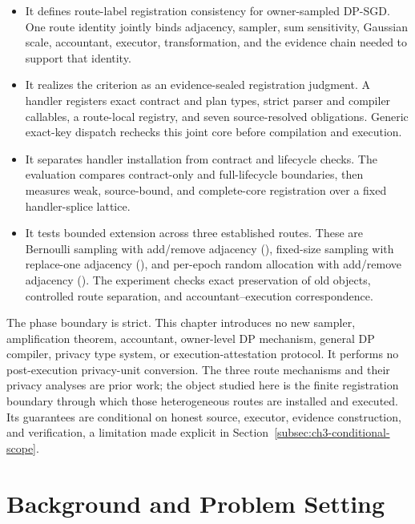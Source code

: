 \begin{itemize}
    \item It defines route-label registration consistency for owner-sampled
    DP-SGD.  One route identity jointly binds adjacency, sampler, sum sensitivity,
    Gaussian scale, accountant, executor, transformation, and the evidence chain
    needed to support that identity.

    \item It realizes the criterion as an evidence-sealed registration judgment.
    A handler registers exact contract and plan types, strict parser and compiler
    callables, a route-local registry, and seven source-resolved obligations.
    Generic exact-key dispatch rechecks this joint core before compilation and
    execution.

    \item It separates handler installation from contract and lifecycle checks.
    The evaluation compares contract-only and full-lifecycle boundaries, then
    measures weak, source-bound, and complete-core registration over a fixed
    handler-splice lattice.

    \item It tests bounded extension across three established routes.  These are
    Bernoulli sampling with add/remove adjacency (\RouteP), fixed-size sampling
    with replace-one adjacency (\RouteF), and per-epoch random allocation with
    add/remove adjacency (\RouteA).  The experiment checks exact preservation of
    old objects, controlled route separation, and accountant--execution
    correspondence.
\end{itemize}

The phase boundary is strict.  This chapter introduces no new sampler,
amplification theorem, accountant, owner-level DP mechanism, general DP compiler,
privacy type system, or execution-attestation protocol.  It performs no
post-execution privacy-unit conversion.  The three route mechanisms and their
privacy analyses are prior work; the object studied here is the finite
registration boundary through which those heterogeneous routes are installed and
executed.  Its guarantees are conditional on honest source, executor, evidence
construction, and verification, a limitation made explicit in
Section~\ref{subsec:ch3-conditional-scope}.

\section{Background and Problem Setting}
\label{sec:ch3-background}

